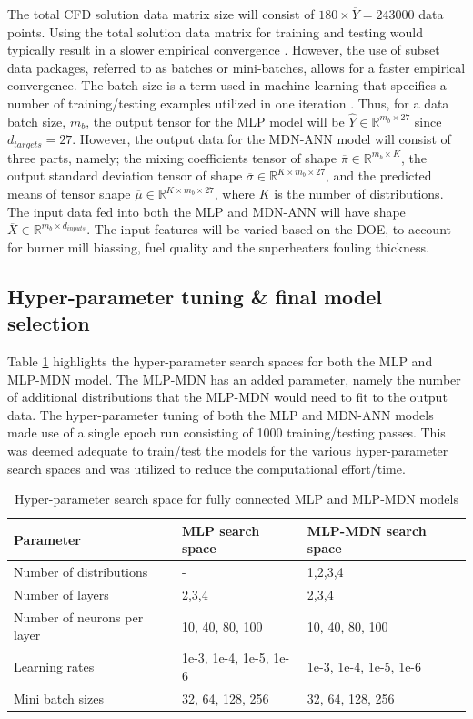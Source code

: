\documentclass[a4paper,fleqn]{cas-dc}
\begin{document}
The total CFD solution data matrix size will consist of $180\times\overline{Y}=243000$ data points. Using the total solution data matrix for training and testing would typically result in a slower empirical convergence \cite{goodfellow}. However, the use of subset data packages, referred to as batches or mini-batches, allows for a faster empirical convergence. The batch size is a term used in machine learning that specifies a number of training/testing examples utilized in one iteration \cite{Wheeler2019}. Thus, for a data batch size, $m_b$, the output tensor for the MLP model will be $\hat{Y}\in \mathbb{R}^{m_b\times 27}$ since $d_{targets}=27$. However, the output data for the MDN-ANN model will consist of three parts, namely; the mixing coefficients tensor of shape  $\overline{\pi}\in \mathbb{R}^{m_b \times K}$, the output standard deviation tensor of shape $\overline{\sigma}\in \mathbb{R}^{K\times m_b\times 27}$, and the predicted means of tensor shape $\overline{\mu}\in \mathbb{R}^{K\times m_b\times 27}$, where $K$ is the number of distributions. The input data fed into both the MLP and MDN-ANN will have shape $\overline{X}\in \mathbb{R}^{m_b\times d_{inputs}}$. The input features will be varied based on the DOE, to account for burner mill biassing, fuel quality and the superheaters fouling thickness.\\
\subsection{Hyper-parameter tuning \& final model selection}\label{sec_hyper}
Table \ref{tbl_tuning} highlights the hyper-parameter search spaces for both the MLP and MLP-MDN model. The MLP-MDN has an added parameter, namely the number of additional distributions that the MLP-MDN would need to fit to the output data. The hyper-parameter tuning of both the MLP and MDN-ANN models made use of a single epoch run consisting of 1000 training/testing passes. This was deemed adequate to train/test the models for the various hyper-parameter search spaces and was utilized to reduce the computational effort/time.\\

\begin{table}[h!]
\caption{Hyper-parameter search space for fully connected MLP and MLP-MDN models}\label{tbl_tuning}
\begin{tabular*}{\tblwidth}{p{}p{}p{}}
\toprule
 Parameter& MLP search space & MLP-MDN search space \\ %
\midrule
 Number of distributions & - & 1,2,3,4  \\
 Number of layers & 2,3,4 & 2,3,4\\
 Number of neurons per layer & 10, 40, 80, 100  & 10, 40, 80, 100\\
 Learning rates & 1e-3, 1e-4, 1e-5, 1e-6 &  1e-3, 1e-4, 1e-5, 1e-6   \\
 Mini batch sizes  &32, 64, 128, 256 &32, 64, 128, 256  \\
\bottomrule
\end{tabular*}
\end{table}
\end{document}
